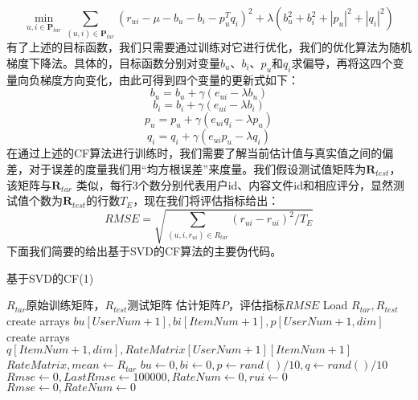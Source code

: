 \documentclass[bachelor]{seuthesis} %
\begin{document}
\begin{Main}
\begin{equation}
\min_{u,i\in\textbf{P}_{tar}}\sum_{(u,i)\in\textbf{P}_{tar}}(r_{ui}-\mu-b_u-b_i-p_u^Tq_i)^2+\lambda(b_u^2+b_i^2+|p_u|^2+|q_i|^2)
\end{equation}
有了上述的目标函数，我们只需要通过训练对它进行优化，我们的优化算法为随机梯度下降法。具体的，目标函数分别对变量$b_u$、$b_i$、$p_u$和$q_i$求偏导，再将这四个变量向负梯度方向变化，由此可得到四个变量的更新式如下：
\begin{equation}
b_u=b_u+\gamma(e_{ui}-\lambda b_u)
\end{equation}
\begin{equation}
b_i=b_i+\gamma(e_{ui}-\lambda b_i)
\end{equation}
\begin{equation}
p_u=p_u+\gamma(e_{ui}q_i-\lambda p_u)
\end{equation}
\begin{equation}
q_i=q_i+\gamma(e_{ui}p_u-\lambda q_i)
\end{equation}
在通过上述的CF算法进行训练时，我们需要了解当前估计值与真实值之间的偏差，对于误差的度量我们用“均方根误差”来度量。我们假设测试值矩阵为$\textbf{R}_{test}$，该矩阵与$\textbf{R}_{tar}$ 类似，每行3个数分别代表用户id、内容文件id和相应评分，显然测试值个数为$\textbf{R}_{test}$的行数$T_E$，现在我们将评估指标给出：
\begin{equation}
RMSE=\sqrt{\sum_{(u,i,r_{ui})\in R_{tar}}(r_{ui}-\hat{r}_{ui})^2/T_E}
\end{equation}
下面我们简要的给出基于SVD的CF算法的主要伪代码。
\begin{algorithm}
    \caption{基于SVD的CF(1)}
    \begin{algorithmic}[1] %
        \Require $R_{tar}$原始训练矩阵，$R_{test}$测试矩阵
        \Ensure 估计矩阵$P$，评估指标$RMSE$
            \State Load $R_{tar},R_{test}$
            \State create arrays $bu[UserNum+1],bi[ItemNum+1],p[UserNum+1,dim]$
            \State create arrays $q[ItemNum+1,dim],RateMatrix[UserNum+1][ItemNum+1]$
            \State $RateMatrix,mean \gets R_{tar}$
                \State $bu\gets0,bi\gets0,p\gets rand()/10,q\gets rand()/10$
            \EndFor
        \EndFunction
        \State $Rmse\gets0,LastRmse\gets100000,RateNum\gets0,rui\gets0$
            \State $Rmse\gets0,RateNum\gets0$

\end{algorithmic}
\end{algorithm}
\end{Main}
\end{document}

